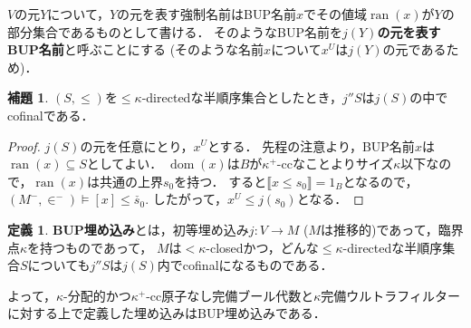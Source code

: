 \documentclass[uplatex,dvipdfmx]{jsarticle}
\newcommand{\range}{\operatorname{ran}}
\newcommand{\dom}{\operatorname{dom}}
\newcommand{\truth}[1]{\llbracket #1 \rrbracket}
\renewcommand\subset{\subseteq}
\theoremstyle{definition}
\newtheorem{defi}[thm]{定義}
\newtheorem{lem}[thm]{補題}
\begin{document}
	$V$の元$Y$について，$Y$の元を表す強制名前はBUP名前$x$でその値域$\range(x)$が$Y$の部分集合であるものとして書ける．
	そのようなBUP名前を\textbf{$j(Y)$の元を表すBUP名前}と呼ぶことにする (そのような名前$x$について$x^U$は$j(Y)$の元であるため)．

	\begin{lem}
		$(S, \le)$を${\le} \kappa$-directedな半順序集合としたとき，$j''S$は$j(S)$の中でcofinalである．
	\end{lem}
	\begin{proof}
		$j(S)$の元を任意にとり，$x^U$とする．
		先程の注意より，BUP名前$x$は$\range(x) \subset S$としてよい．
		$\dom(x)$は$B$が$\kappa^+$-ccなことよりサイズ$\kappa$以下なので，$\range(x)$は共通の上界$s_0$を持つ．
		すると$\truth{x \le s_0} = 1_B$となるので，$(M^-, \in^-) \models [x] \le \check{s_0}$.
		したがって，$x^U \le j(s_0)$となる．
	\end{proof}

	\begin{defi}
		\textbf{BUP埋め込み}とは，初等埋め込み$j \colon V \to M$ ($M$は推移的)であって，臨界点$\kappa$を持つものであって，
		$M$は${<}\kappa$-closedかつ，どんな${\le}\kappa$-directedな半順序集合$S$についても$j''S$は$j(S)$内でcofinalになるものである．
	\end{defi}

	よって，$\kappa$-分配的かつ$\kappa^+$-cc原子なし完備ブール代数と$\kappa$完備ウルトラフィルターに対する上で定義した埋め込みはBUP埋め込みである．
\end{document}
